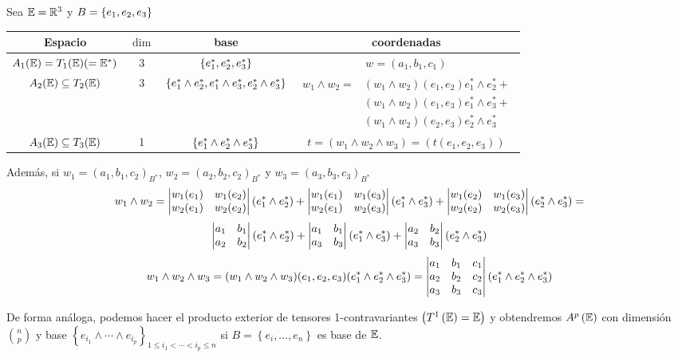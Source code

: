 \begin{example}
	Sea $\mathbb{E}=\mathbb{R}^3$ y $B = \left\{e_1,e_2,e_3\right\}$
	\begin{center}
		\begin{tabular}{|c|c|c|c|}
			\hline
			Espacio & $\dim$ & base & coordenadas \\
			\hline \hline
			$A_1(\mathbb{E})= T_1(\mathbb{E}) (=\mathbb{E}^*)$ & 3 & $\left\{e_1^*,e_2^*,e_3^*\right\}$ &
			$w = (a_1,b_1,c_1)$ \\ \hline $A_2(\mathbb{E}) \subseteq T_2(\mathbb{E})$ & 3 &
			$\left\{e_1^* \wedge e_2^*, e_1^* \wedge e_3^*, e_2^* \wedge e_3^*\right\}$ &
			$\begin{aligned}
				w_1 \wedge w_2 =& (w_1 \wedge w_2)(e_1,e_2) e_1^* \wedge e_2^* + \\
				 & (w_1 \wedge w_2)(e_1,e_3) e_1^* \wedge e_3^* + \\
				 & (w_1 \wedge w_2)(e_2,e_3) e_2^* \wedge e_3^*
			\end{aligned}$ \\
			\hline $A_3(\mathbb{E}) \subseteq T_3(\mathbb{E})$ & 1 &
			$\left\{e_1^* \wedge e_2^* \wedge e_3^*\right\}$ &
			$t =(w_1 \wedge w_2 \wedge w_3) = (t(e_1,e_2,e_3))$ \\ \hline
		\end{tabular}
	\end{center}
	Además, si $w_1=(a_1,b_1,c_2)_{B^*}$, $w_2=(a_2,b_2,c_2)_{B^*}$ y
	$w_3=(a_3,b_3,c_3)_{B^*}$
	\[
		w_1 \wedge w_2 = \begin{vmatrix}w_1(e_1) & w_1(e_2) \\ w_2(e_1) & w_2(e_2)\end{vmatrix}
		(e_1^* \wedge e_2^*) + \begin{vmatrix}w_1(e_1) & w_1(e_3) \\ w_2(e_1) & w_2(e_3)\end{vmatrix}
        (e_1^* \wedge e_3^*) + \begin{vmatrix}w_1(e_2) & w_1(e_3) \\ w_2(e_2) & w_2(e_3)\end{vmatrix}
        (e_2^* \wedge e_3^*) =
    \]
    \[
		\begin{vmatrix}a_1 & b_1 \\ a_2 & b_2\end{vmatrix}(e_1^* \wedge e_2^*) +
		\begin{vmatrix}a_1 & b_1 \\ a_3 & b_3\end{vmatrix}(e_1^* \wedge e_3^*)
		+ \begin{vmatrix}a_2 & b_2 \\ a_3 & b_3\end{vmatrix}(e_2^* \wedge e_3^*)
	\]
	\[
		w_1 \wedge w_2 \wedge w_3 = (w_1 \wedge w_2 \wedge w_3)	(e_1,e_2,e_3)
		(e_1^* \wedge e_2^* \wedge e_3^*) =
		\begin{vmatrix}a_1 & b_1 & c_1 \\ a_2 & b_2 & c_2 \\ a_3 & b_3 & c_3\end{vmatrix}
		(e_1^* \wedge e_2^* \wedge e_3^*)
	\]
\end{example}

\begin{obs}
	De forma análoga, podemos hacer el producto exterior de tensores 1-contravariantes $\left( T^1 \left( \mathbb{E} \right) = \mathbb{E} \right)$ y obtendremos $A^p\left( \mathbb{E} \right)$ con dimensión $\binom{n}{p}$ y base $\left\{ e_{i_1} \wedge \cdots \wedge e_{i_p} \right\}_{1 \leq i_1 < \cdots < i_p \leq n}$ si $B=\left\{e_i, \dots , e_n\right\}$ es base de $\mathbb{E}$.
\end{obs}

